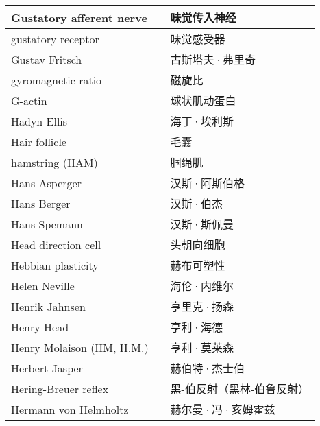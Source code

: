 \begin{longtable}{lll}
	\midrule
	Gustatory afferent nerve     &&  味觉传入神经  \\
	
	\midrule
	gustatory receptor     &&  味觉感受器  \\
	
	\midrule
	Gustav Fritsch     &&  古斯塔夫·弗里奇  \\
	
	\midrule
	gyromagnetic ratio     &&  磁旋比  \\
	
	\midrule
	G-actin    &&  球状肌动蛋白  \\
	
	\midrule
	Hadyn Ellis    &&  海丁·埃利斯  \\
	
	\midrule
	Hair follicle    &&  毛囊  \\
	
	\midrule
	hamstring (HAM)    &&  腘绳肌  \\
	
	\midrule
	Hans Asperger    &&  汉斯·阿斯伯格  \\
	
	\midrule
	Hans Berger    &&  汉斯·伯杰  \\
	
	\midrule
	Hans Spemann    &&  汉斯·斯佩曼  \\
	
	\midrule
	Head direction cell    &&  头朝向细胞  \\
	
	\midrule
	Hebbian plasticity    &&  赫布可塑性  \\
	
	\midrule
	Helen Neville    &&  海伦·内维尔  \\
	
	\midrule
	Henrik Jahnsen    &&  亨里克·扬森  \\
	
	\midrule
	Henry Head    &&  亨利·海德  \\
	
	\midrule
	Henry Molaison (HM, H.M.)   &&  亨利·莫莱森  \\
	
	\midrule
	Herbert Jasper     &&  赫伯特·杰士伯  \\
	
	\midrule
	Hering-Breuer reflex     &&  黑-伯反射（黑林-伯鲁反射）  \\
	
	\midrule
	Hermann von Helmholtz     &&  赫尔曼·冯·亥姆霍兹 \\
	

\end{longtable}
